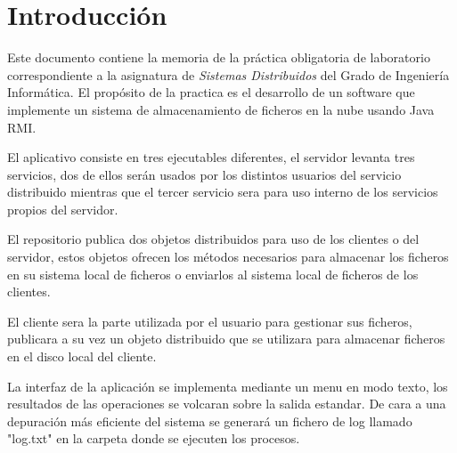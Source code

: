 
\chapter{Introducción}

Este documento contiene la memoria de la práctica obligatoria de laboratorio correspondiente a la asignatura de \emph{Sistemas Distribuidos} del Grado de Ingeniería Informática. El propósito de la practica es el desarrollo de un software que implemente un sistema de almacenamiento de ficheros en la nube usando Java RMI.

El aplicativo consiste en tres ejecutables diferentes, el servidor levanta tres servicios, dos de ellos serán usados por los distintos usuarios del servicio distribuido mientras que el tercer servicio sera para uso interno de los servicios propios del servidor.

El repositorio publica dos objetos distribuidos para uso de los clientes o del servidor, estos objetos ofrecen los métodos necesarios para almacenar los ficheros en su sistema local de ficheros o enviarlos al sistema local de ficheros de los clientes.

El cliente sera la parte utilizada por el usuario para gestionar sus ficheros, publicara a su vez un objeto distribuido que se utilizara para almacenar ficheros en el disco local del cliente.

La interfaz de la aplicación se implementa mediante un menu en modo texto, los resultados de las operaciones se volcaran sobre la salida estandar. De cara a una depuración más eficiente del sistema se generará un fichero de log llamado "log.txt" en la carpeta donde se ejecuten los procesos.


